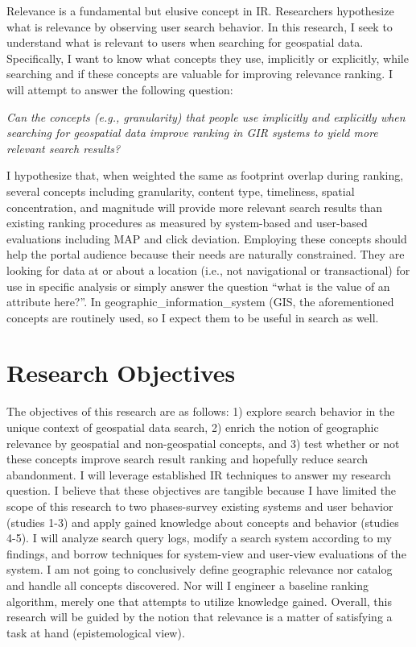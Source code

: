 Relevance is a fundamental but elusive concept in IR. Researchers hypothesize what is relevance by observing user search behavior. In this research, I seek to understand what is relevant to users when searching for geospatial data. Specifically, I want to know what concepts they use, implicitly or explicitly, while searching and if these concepts are valuable for improving relevance ranking. I will attempt to answer the following question:
\linebreak

\emph{Can the concepts (e.g., granularity) that people use implicitly and explicitly when searching for geospatial data improve ranking in GIR systems to yield more relevant search results?}
\linebreak

I hypothesize that, when weighted the same as footprint overlap during ranking, several concepts including granularity, content type, timeliness, spatial concentration, and magnitude will provide more relevant search results than existing ranking procedures as measured by system-based and user-based evaluations including MAP and click deviation. Employing these concepts should help the portal audience because their needs are naturally constrained. They are looking for data at or about a location (i.e., not navigational or transactional) for use in specific analysis or simply answer the question “what is the value of an attribute here?”.  In \gls{geographic_information_system} (\acrshort{GIS}, the aforementioned concepts are routinely used, so I expect them to be useful in search as well.

\section{Research Objectives}

The objectives of this research are as follows: 1) explore search behavior in the unique context of geospatial data search, 2) enrich the notion of geographic relevance by geospatial and non-geospatial concepts, and 3) test whether or not these concepts improve search result ranking and hopefully reduce search abandonment. I will leverage established IR techniques to answer my research question. I believe that these objectives are tangible because I have limited the scope of this research to two phases-survey existing systems and user behavior (studies 1-3) and apply gained knowledge about concepts and behavior (studies 4-5). I will analyze search query logs, modify a search system according to my findings, and borrow techniques for system-view and user-view evaluations of the system. I am not going to conclusively define geographic relevance nor catalog and handle all concepts discovered. Nor will I  engineer a baseline ranking algorithm, merely one that attempts to utilize knowledge gained. Overall, this research will be guided by the notion that relevance is a matter of satisfying a task at hand (epistemological view).